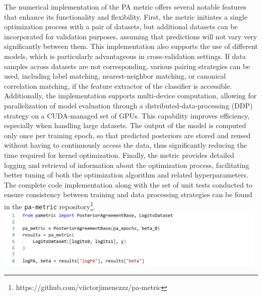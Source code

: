 
The numerical implementation of the PA metric offers several notable features that enhance its functionality 
and flexibility. First, the metric initiates a single optimization process with a pair of datasets, but 
additional datasets can be incorporated for validation purposes, assuming that predictions will not
vary very significantly between them. This implementation also supports the use of different models, which 
is particularly advantageous in cross-validation settings. If data samples across datasets are not corresponding, 
various pairing strategies can be used, including label matching, nearest-neighbor matching, or canonical 
correlation matching, if the feature extractor of the classifier is accessible. \\

Additionally, the implementation supports multi-device computation, allowing for parallelization of model evaluation 
through a distributed-data-processing (DDP) strategy on a CUDA-managed set of GPUs. This capability improves efficiency, 
especially when handling large datasets. The output of the model is computed only once per training epoch,
so that predicted posteriors are stored and reused without having to continuously access the data, thus
significantly reducing the time required for kernel optimization. Finally, the metric provides detailed 
logging and retrieval of information about the optimization process, facilitating better tuning of both the 
optimization algorithm and related hyperparameters. \\

The complete code implementation along with the set of unit tests conducted 
to ensure consistency between training and data processing strategies can be 
found in the \texttt{pa-metric} repository\footnote{https://github.com/viictorjimenezzz/pa-metric}. \\

\fboxrule=1pt           %
\fboxsep=1pt            %
\colorbox{gray!30}{     %
    \includegraphics[width=0.98\textwidth]{img/theoretical_background/pametric_code.png}  %
}

